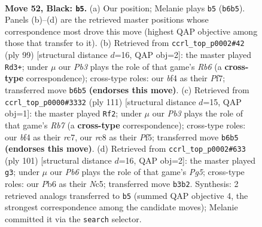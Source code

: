 \documentclass[11pt]{article}
\begin{document}
\clearpage

\begin{figure}[p]\centering
\begin{subfigure}{0.46\textwidth}\centering
\resizebox{\linewidth}{!}{%
\newchessgame
\chessboard[
  setfen={2R5/7r/rp4k1/8/3PKB2/1p6/8/8 b - - 1 52},
  showmover=false,
  pgfstyle=straightmove, color=movearrow, markmove={b6-b5}
]}
\caption{}
\end{subfigure}\hfill
\begin{subfigure}{0.46\textwidth}\centering
\resizebox{\linewidth}{!}{%
\newchessgame
\chessboard[
  setfen={5k2/5p2/2PK4/8/6p1/1r6/8/7R b - - 1 50},
  showmover=false,
  pgfstyle=straightmove, color=movearrow, markmove={b3-d3}
]}
\caption{}
\end{subfigure}
\\[4pt]
\begin{subfigure}{0.46\textwidth}\centering
\resizebox{\linewidth}{!}{%
\newchessgame
\chessboard[
  setfen={8/2R5/4k3/5p2/B2b4/5PPK/1r6/8 b - - 12 56},
  showmover=false,
  pgfstyle=straightmove, color=movearrow, markmove={b2-f2}
]}
\caption{}
\end{subfigure}\hfill
\begin{subfigure}{0.46\textwidth}\centering
\resizebox{\linewidth}{!}{%
\newchessgame
\chessboard[
  setfen={8/8/8/P1n5/5kp1/R7/2r5/5BK1 b - - 14 51},
  showmover=false,
  pgfstyle=straightmove, color=movearrow, markmove={g4-g3}
]}
\caption{}
\end{subfigure}
\caption{\textbf{Move 52, Black: \texttt{b5}.} (a) Our position; Melanie plays \texttt{b5} (\texttt{b6b5}). Panels (b)--(d) are the retrieved master positions whose correspondence most drove this move (highest QAP objective among those that transfer to it). (b) Retrieved from \texttt{ccrl\_top\_p0002\#42} (ply 99) [structural distance $d$=16, QAP obj=2]: the master played \texttt{Rd3+}; under $\mu$ our \emph{Pb3} plays the role of that game's \emph{Rb6} (a \textbf{cross-type} correspondence); cross-type roles: our \emph{b}f4 as their \emph{P}f7; transferred move \texttt{b6b5} \textbf{(endorses this move)}. (c) Retrieved from \texttt{ccrl\_top\_p0000\#3332} (ply 111) [structural distance $d$=15, QAP obj=1]: the master played \texttt{Rf2}; under $\mu$ our \emph{Pb3} plays the role of that game's \emph{Rb7} (a \textbf{cross-type} correspondence); cross-type roles: our \emph{b}f4 as their \emph{r}c7, our \emph{r}c8 as their \emph{P}f5; transferred move \texttt{b6b5} \textbf{(endorses this move)}. (d) Retrieved from \texttt{ccrl\_top\_p0002\#633} (ply 101) [structural distance $d$=16, QAP obj=2]: the master played \texttt{g3}; under $\mu$ our \emph{Pb6} plays the role of that game's \emph{Pg5}; cross-type roles: our \emph{P}b6 as their \emph{N}c5; transferred move \texttt{b3b2}. Synthesis: 2 retrieved analogs transferred to \texttt{b5} (summed QAP objective 4, the strongest correspondence among the candidate moves); Melanie committed it via the \texttt{search} selector.}
\label{fig:thought-m103}
\end{figure}
\end{document}
